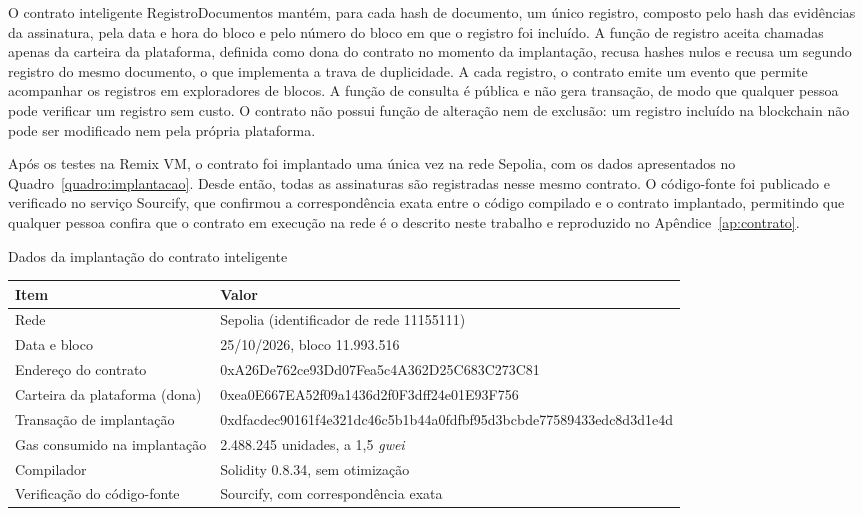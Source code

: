 \documentclass[
    12pt,
    a4paper,
    oneside,
    chapter=TITLE,
    section=TITLE,
    subsection=TITLE,
    subsubsection=TITLE,
    sumario=tradicional,
    english,
    brazil
]{abntex2}
\begin{document}
O contrato inteligente RegistroDocumentos mantém, para cada hash de documento, um único registro, composto pelo hash das evidências da assinatura, pela data e hora do bloco e pelo número do bloco em que o registro foi incluído. A função de registro aceita chamadas apenas da carteira da plataforma, definida como dona do contrato no momento da implantação, recusa hashes nulos e recusa um segundo registro do mesmo documento, o que implementa a trava de duplicidade. A cada registro, o contrato emite um evento que permite acompanhar os registros em exploradores de blocos. A função de consulta é pública e não gera transação, de modo que qualquer pessoa pode verificar um registro sem custo. O contrato não possui função de alteração nem de exclusão: um registro incluído na blockchain não pode ser modificado nem pela própria plataforma.

Após os testes na Remix VM, o contrato foi implantado uma única vez na rede Sepolia, com os dados apresentados no Quadro~\ref{quadro:implantacao}. Desde então, todas as assinaturas são registradas nesse mesmo contrato. O código-fonte foi publicado e verificado no serviço Sourcify, que confirmou a correspondência exata entre o código compilado e o contrato implantado, permitindo que qualquer pessoa confira que o contrato em execução na rede é o descrito neste trabalho e reproduzido no Apêndice~\ref{ap:contrato}.

\begin{quadro}[htb]
    \caption{Dados da implantação do contrato inteligente}
    \label{quadro:implantacao}
    \centering
    \small
    \begin{tabular}{L{3.6cm}L{11.2cm}}
        \toprule
        \textbf{Item} & \textbf{Valor} \\
        \midrule
        Rede & Sepolia (identificador de rede 11155111) \\
        Data e bloco & 25/10/2026, bloco 11.993.516 \\
        Endereço do contrato & {\scriptsize\ttfamily0xA26De762ce93Dd07Fea5c4A362D25C683C273C81} \\
        Carteira da plataforma (dona) & {\scriptsize\ttfamily0xea0E667EA52f09a1436d2f0F3dff24e01E93F756} \\
        Transação de implantação & {\scriptsize\ttfamily0xdfacdec90161f4e321dc46c5b1b44a0fdfbf95d3bcbde77589433edc8d3d1e4d} \\
        Gas consumido na implantação & 2.488.245 unidades, a 1,5 \emph{gwei} \\
        Compilador & Solidity 0.8.34, sem otimização \\
        Verificação do código-fonte & Sourcify, com correspondência exata \\
        \bottomrule
    \end{tabular}
\end{quadro}
\end{document}
